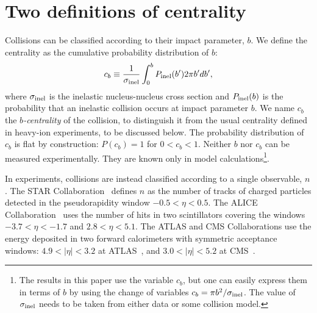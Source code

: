 \documentclass[aps,prc,twocolumn,superscriptaddress,showpacs,floatfix,nofootinbib]{revtex4-1}
\begin{document}
\section{Two definitions of centrality}
\label{s:defcent}

Collisions can be classified according to their impact parameter, $b$. 
We define the centrality as the cumulative probability distribution of $b$: 
\begin{equation}
\label{defcb}
c_b\equiv \frac{1}{\sigma_{\rm inel}}\int_0^{b} P_{\rm inel}(b')2\pi b'db',
\end{equation}
where $\sigma_{\rm inel}$ is the inelastic nucleus-nucleus cross section and $P_{\rm inel}(b)$ is the probability that an inelastic collision occurs at impact parameter $b$. 
We name $c_b$ the \textit{$b$-centrality} of the collision, to distinguish it from the usual centrality defined in heavy-ion experiments, to be discussed below.  
The probability distribution of $c_b$ is flat by construction: $P(c_b)=1$ for $0<c_b<1$. 
Neither $b$ nor $c_b$ can be measured experimentally. 
They are known only in model calculations\footnote{The results in this paper use the variable $c_b$, but one can easily express them in terms of $b$ by using the change of variables  $c_b=\pi b^2/{\sigma}_{\rm inel}$. The value of $\sigma_{\rm inel}$ needs to be taken from either data or some collision model.}.

In experiments, collisions are instead classified according to a single observable, $n$. 
The STAR Collaboration~\cite{Adamczyk:2015obl} defines $n$ as the number of tracks of charged particles detected in the pseudorapidity window $-0.5<\eta<0.5$. 
The ALICE Collaboration~\cite{Abelev:2013qoq} uses the number of hits in two scintillators covering the windows $-3.7<\eta<-1.7$ and $2.8<\eta<5.1$.
The ATLAS and CMS Collaborations use the energy deposited in two forward calorimeters with symmetric acceptance windows: $4.9<|\eta|<3.2$ at ATLAS~\cite{ATLAS:2011ah}, and $3.0<|\eta|<5.2$ at CMS~\cite{Chatrchyan:2012vq}.
\end{document}
